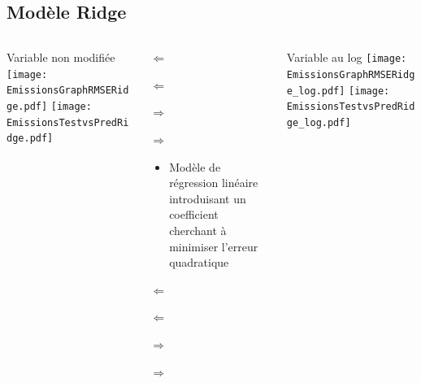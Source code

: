 \documentclass[8pt,aspectratio=169,hyperref={unicode=true}]{beamer}
\begin{document}
\subsection{Modèle Ridge}
\begin{frame}{\insertsubsection}
  \begin{columns}[t]
    \begin{column}{.33\textwidth}
      \centering Variable non modifiée
      \texttt{[image: EmissionsGraphRMSERidge.pdf]}
      \texttt{[image: EmissionsTestvsPredRidge.pdf]}
    \end{column}
    \begin{column}{.33\textwidth}
      $\Longleftarrow$

      

      \raggedright
      $\Longleftarrow$

      \raggedleft
      $\Longrightarrow$

      

      \raggedleft
      $\Longrightarrow$

      \raggedright
      \begin{itemize}
        \item Modèle de régression linéaire introduisant un coefficient cherchant à minimiser
              l'erreur quadratique
      \end{itemize}

      $\Longleftarrow$
      {\scriptsize \centering
          }

      $\Longleftarrow$

      \raggedleft
      $\Longrightarrow$

      {\scriptsize \centering
          
        }
      \raggedleft
      $\Longrightarrow$
    \end{column}
    \begin{column}{.33\textwidth}
      \centering Variable au log
      \texttt{[image: EmissionsGraphRMSERidge\_log.pdf]}
      \texttt{[image: EmissionsTestvsPredRidge\_log.pdf]}
    \end{column}
  \end{columns}
\end{frame}
\end{document}
